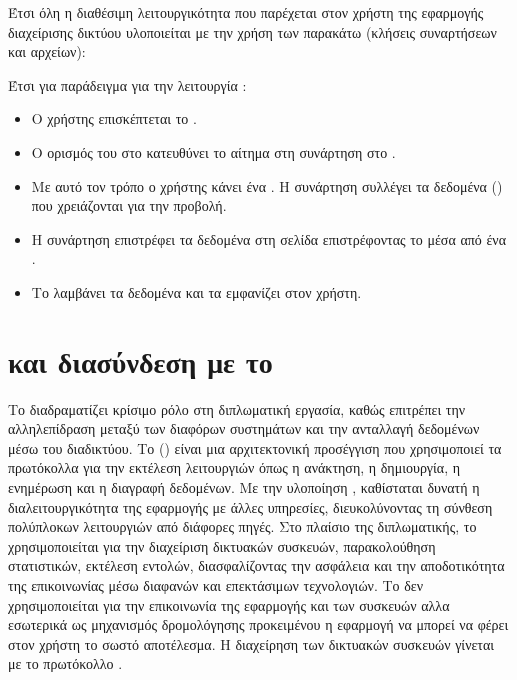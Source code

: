 \FloatBarrier

Έτσι όλη η διαθέσιμη λειτουργικότητα που παρέχεται στον χρήστη της εφαρμογής διαχείρισης δικτύου υλοποιείται με την χρήση των παρακάτω  (κλήσεις συναρτήσεων και  αρχείων):

Έτσι για παράδειγμα για την λειτουργία  : 

\begin{itemize}
    \item Ο χρήστης επισκέπτεται το  . 
    \item Ο ορισμός του  στο  κατευθύνει το αίτημα στη συνάρτηση  στο .
    \item Με αυτό τον τρόπο ο χρήστης κάνει ένα . Η συνάρτηση  συλλέγει τα δεδομένα () που χρειάζονται για την προβολή.
    \item Η συνάρτηση  επιστρέφει τα δεδομένα στη σελίδα  επιστρέφοντας το μέσα από ένα .
    \item Το   λαμβάνει τα δεδομένα και τα εμφανίζει στον χρήστη.
\end{itemize}


\section{ και διασύνδεση με το }

Το  διαδραματίζει κρίσιμο ρόλο στη 
διπλωματική εργασία, καθώς επιτρέπει την αλληλεπίδραση μεταξύ των 
διαφόρων συστημάτων και την ανταλλαγή δεδομένων μέσω του διαδικτύου. 
Το  () είναι μια 
αρχιτεκτονική προσέγγιση που χρησιμοποιεί τα πρωτόκολλα  
για την εκτέλεση λειτουργιών όπως η ανάκτηση, η δημιουργία, η 
ενημέρωση και η διαγραφή δεδομένων. Με την υλοποίηση , 
καθίσταται δυνατή η διαλειτουργικότητα της εφαρμογής με άλλες 
υπηρεσίες, διευκολύνοντας τη σύνθεση πολύπλοκων λειτουργιών από 
διάφορες πηγές. Στο πλαίσιο της διπλωματικής, το  
χρησιμοποιείται για την διαχείριση δικτυακών συσκευών, παρακολούθηση 
στατιστικών, εκτέλεση εντολών, διασφαλίζοντας την ασφάλεια και την 
αποδοτικότητα της επικοινωνίας μέσω διαφανών και επεκτάσιμων 
τεχνολογιών. Το  δεν χρησιμοποιείται για την επικοινωνία της εφαρμογής
και των συσκευών αλλα εσωτερικά ως μηχανισμός δρομολόγησης προκειμένου η εφαρμογή
να μπορεί να φέρει στον χρήστη το σωστό αποτέλεσμα. Η διαχείρηση των δικτυακών
συσκευών γίνεται με το πρωτόκολλο .

